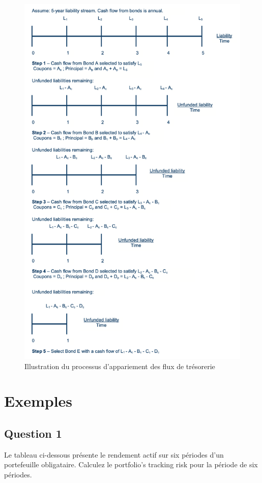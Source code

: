 \documentclass[12pt]{article}
\begin{document}
\begin{itemize}
\begin{figure}[H]
\caption{Illustration du processus d'appariement des flux de trésorerie}
\centering
\includegraphics[width=14cm]{4}
\end{figure}

\section{Exemples}
\subsection{Question 1}
Le tableau ci-dessous présente le rendement actif sur six périodes d'un portefeuille obligataire. Calculez le portfolio’s tracking risk pour la période de six périodes.


\end{itemize}
\end{document}
